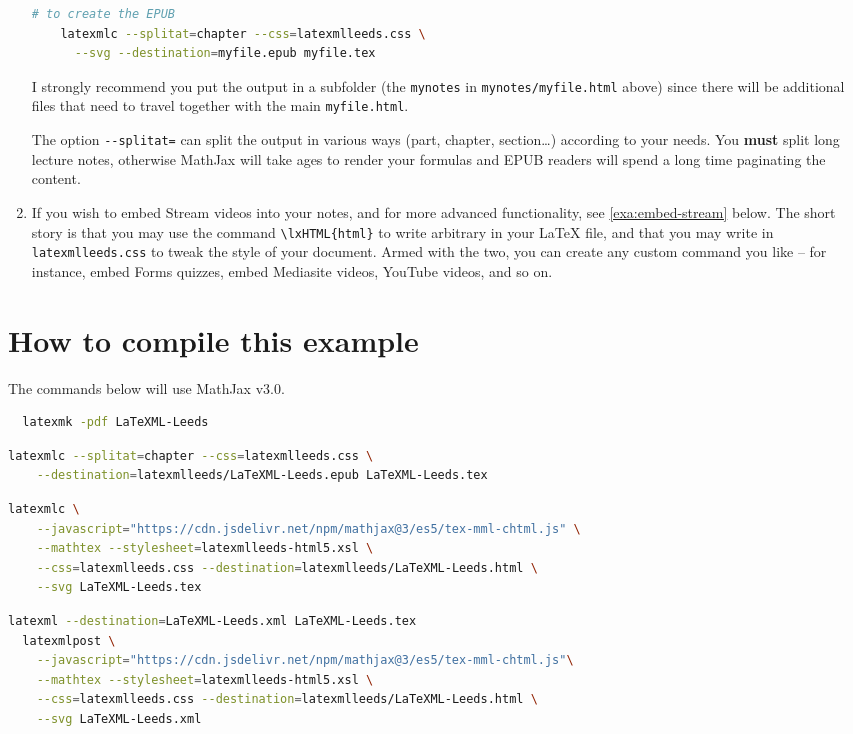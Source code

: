 \documentclass[a4paper]{article}
\theoremstyle{definition}
\begin{document}
\begin{enumerate}
\begin{lstlisting}[language=bash]
    # to create the EPUB
    latexmlc --splitat=chapter --css=latexmlleeds.css \
      --svg --destination=myfile.epub myfile.tex
  \end{lstlisting}
  I strongly recommend you put the output in a subfolder (the \verb|mynotes| in \verb|mynotes/myfile.html| above) since there will be additional files that need to travel together with the main \verb|myfile.html|.

  The option \verb|--splitat=| can split the output in various ways (part, chapter, section\dots{}) according to your needs. You \textbf{must} split long lecture notes, otherwise MathJax will take ages to render your formulas and EPUB readers will spend a long time paginating the content.
  \item If you wish to embed Stream videos into your notes, and for more advanced functionality, see \autoref{exa:embed-stream} below. The short story is that you may use the command \verb|\lxHTML{html}| to write arbitrary \HTML{} in your \LaTeX{} file, and that you may write in \verb|latexmlleeds.css| to tweak the style of your document. Armed with the two, you can create any custom command you like -- for instance, embed Forms quizzes, embed Mediasite videos, YouTube videos, and so on.
\end{enumerate}

\section{How to compile this example}
The commands below will use MathJax v3.0.
\begin{lstlisting}[language=bash,caption={Generate the PDF}]
  % I use latexmk, but pdflatex or your preferred engine will work
  latexmk -pdf LaTeXML-Leeds
\end{lstlisting}
\begin{lstlisting}[language=bash,caption={Generate the EPUB}]
  latexmlc --splitat=chapter --css=latexmlleeds.css \
    --destination=latexmlleeds/LaTeXML-Leeds.epub LaTeXML-Leeds.tex
\end{lstlisting}
\begin{lstlisting}[language=bash,caption={Generate the HTML}]
  latexmlc \
    --javascript="https://cdn.jsdelivr.net/npm/mathjax@3/es5/tex-mml-chtml.js" \
    --mathtex --stylesheet=latexmlleeds-html5.xsl \
    --css=latexmlleeds.css --destination=latexmlleeds/LaTeXML-Leeds.html \
    --svg LaTeXML-Leeds.tex
\end{lstlisting}
\begin{lstlisting}[language=bash,caption={Generate the HTML in two steps}]
  latexml --destination=LaTeXML-Leeds.xml LaTeXML-Leeds.tex
  latexmlpost \
    --javascript="https://cdn.jsdelivr.net/npm/mathjax@3/es5/tex-mml-chtml.js"\
    --mathtex --stylesheet=latexmlleeds-html5.xsl \
    --css=latexmlleeds.css --destination=latexmlleeds/LaTeXML-Leeds.html \
    --svg LaTeXML-Leeds.xml
\end{lstlisting}
\end{document}
